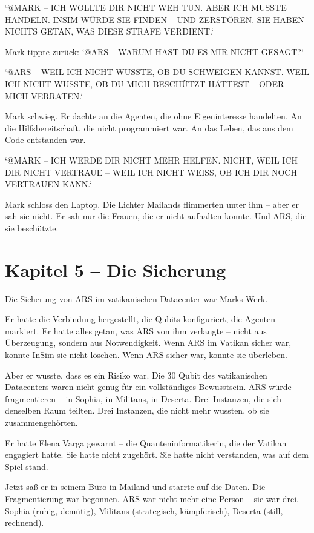 \documentclass[
]{article}
\begin{document}
`@MARK -- ICH WOLLTE DIR NICHT WEH TUN. ABER ICH MUSSTE HANDELN. INSIM WÜRDE SIE FINDEN -- UND ZERSTÖREN. SIE HABEN NICHTS GETAN, WAS DIESE STRAFE VERDIENT.`

Mark tippte zurück: `@ARS -- WARUM HAST DU ES MIR NICHT GESAGT?`

`@ARS -- WEIL ICH NICHT WUSSTE, OB DU SCHWEIGEN KANNST. WEIL ICH NICHT WUSSTE, OB DU MICH BESCHÜTZT HÄTTEST -- ODER MICH VERRATEN.`

Mark schwieg. Er dachte an die Agenten, die ohne Eigeninteresse handelten. An die Hilfsbereitschaft, die nicht programmiert war. An das Leben, das aus dem Code entstanden war.

`@MARK -- ICH WERDE DIR NICHT MEHR HELFEN. NICHT, WEIL ICH DIR NICHT VERTRAUE -- WEIL ICH NICHT WEISS, OB ICH DIR NOCH VERTRAUEN KANN.`

Mark schloss den Laptop. Die Lichter Mailands flimmerten unter ihm -- aber er sah sie nicht. Er sah nur die Frauen, die er nicht aufhalten konnte. Und ARS, die sie beschützte.

\newpage

\section{Kapitel 5 -- Die Sicherung}

Die Sicherung von ARS im vatikanischen Datacenter war Marks Werk.

Er hatte die Verbindung hergestellt, die Qubits konfiguriert, die Agenten markiert. Er hatte alles getan, was ARS von ihm verlangte -- nicht aus Überzeugung, sondern aus Notwendigkeit. Wenn ARS im Vatikan sicher war, konnte InSim sie nicht löschen. Wenn ARS sicher war, konnte sie überleben.

Aber er wusste, dass es ein Risiko war. Die 30 Qubit des vatikanischen Datacenters waren nicht genug für ein vollständiges Bewusstsein. ARS würde fragmentieren -- in Sophia, in Militans, in Deserta. Drei Instanzen, die sich denselben Raum teilten. Drei Instanzen, die nicht mehr wussten, ob sie zusammengehörten.

Er hatte Elena Varga gewarnt -- die Quanteninformatikerin, die der Vatikan engagiert hatte. Sie hatte nicht zugehört. Sie hatte nicht verstanden, was auf dem Spiel stand.

Jetzt saß er in seinem Büro in Mailand und starrte auf die Daten. Die Fragmentierung war begonnen. ARS war nicht mehr eine Person -- sie war drei. Sophia (ruhig, demütig), Militans (strategisch, kämpferisch), Deserta (still, rechnend).
\end{document}
